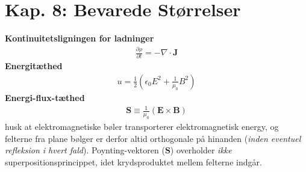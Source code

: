 \documentclass[a4paper]{article}
\begin{document}
    \newpage
    \section{Kap. 8: Bevarede Størrelser}
    \textbf{Kontinuitetsligningen for ladninger} \begin{align*} 
        \boxed{\frac{\partial \rho }{\partial t} = - \nabla \cdot \mathbf{J}}\tag{8.4}
    \end{align*}
    \textbf{Energitæthed}\begin{align*}
        u = \frac{1}{2} \left( \epsilon _0 E^2 + \frac{1}{\mu _0} B^{2}\right)  \tag{8.5}
    \end{align*} 
    \textbf{Energi-flux-tæthed}\begin{align*}
        \boxed{\mathbf{S} \equiv \frac{1}{\mu _0} \left( \mathbf{E} \times \mathbf{B} \right)} \tag{8.10}
    \end{align*} 
    husk at elektromagnetiske bøler transporterer elektromagnetisk energy, og felterne fra plane bølger er derfor altid orthogonale på hinanden (\textit{inden eventuel refleksion i hvert fald}). Poynting-vektoren (\(\mathbf{S}\)) overholder \textit{ikke} superpositionsprincippet, idet krydsproduktet mellem felterne indgår.
\end{document}
